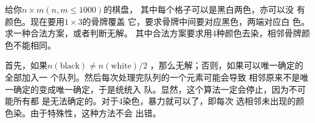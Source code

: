 \begin{prob}
	给你$n \times m(n,m\le 1000)$的棋盘，
	其中每个格子可以是黑白两色，亦可以没
	有颜色。现在要用$1\times 3$的骨牌覆盖
	它，要求骨牌中间要对应黑色，两端对应白
	色。求一种合法方案，或者判断无解。
	其中合法方案要求用4种颜色去染，相邻骨牌颜色不能相同。
\end{prob}

\begin{sol}
	首先，如果$n(\text{black})\not =n(\text{white})/2$
	，那么无解；否则，如果可以唯一确定的全部加入一
	个队列。然后每次处理完队列的一个元素可能会导致
	相邻原来不是唯一确定的变成唯一确定，于是统统入
	队。显然，这个算法一定会停止，因为不可能所有都
	是无法确定的。对于4染色，暴力就可以了，即每次
	选相邻未出现的颜色染。由于特殊性，这种方法不会
	出错。
\end{sol}
